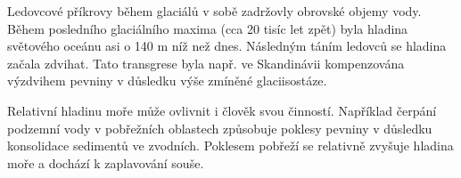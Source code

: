 Ledovcové příkrovy během glaciálů v sobě zadržovly obrovské objemy vody. Během posledního glaciálního maxima (cca 20 tisíc let zpět) byla hladina světového oceánu asi o 140 m níž než dnes. Následným táním ledovců se hladina začala zdvihat. Tato transgrese byla např. ve Skandinávii kompenzována výzdvihem pevniny v důsledku výše zmíněné glaciisostáze.

Relativní hladinu moře může ovlivnit i člověk svou činností. Například čerpání podzemní vody v pobřežních oblastech způsobuje poklesy pevniny v důsledku konsolidace sedimentů ve zvodních. Poklesem pobřeží se relativně zvyšuje hladina moře a dochází k zaplavování souše.


%

%		
%
%	
